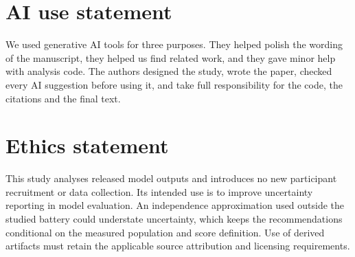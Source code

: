 \label{maintext:end}
\section*{AI use statement}
We used generative AI tools for three purposes. They helped polish the wording of the manuscript, they helped us find related work, and they gave minor help with analysis code. The authors designed the study, wrote the paper, checked every AI suggestion before using it, and take full responsibility for the code, the citations and the final text.

\section*{Ethics statement}
This study analyses released model outputs and introduces no new participant recruitment or data collection. Its intended use is to improve uncertainty reporting in model evaluation. An independence approximation used outside the studied battery could understate uncertainty, which keeps the recommendations conditional on the measured population and score definition. Use of derived artifacts must retain the applicable source attribution and licensing requirements.

